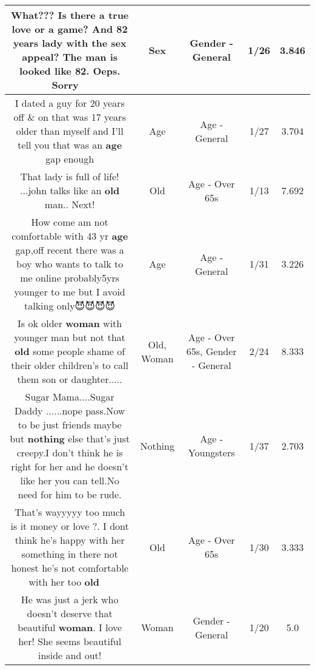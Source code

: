 \documentclass[11pt]{article}
\newlength\mylength
\begin{document}
\begin{center}
\begin{longtable}{|C{.65\mylength}|C{.30\mylength}|C{.12\mylength}|C{.12\mylength}|C{.12\mylength}|}
  \small What??? Is there a true love or a game?  And 82 years lady with the \textbf{sex} appeal? The man is looked like 82. Oeps. Sorry 🙈🙊\normalsize   & Sex & Gender - General & 1/26 & 3.846 \\  \hline
  \small I dated a guy for 20 years off \& on that was 17 years older than myself and I'll tell you that was an \textbf{age} gap enough\normalsize   & Age & Age - General & 1/27 & 3.704 \\  \hline
  \small That lady is full of life! ...john talks like an \textbf{old} man.. Next!\normalsize   & Old & Age - Over 65s & 1/13 & 7.692 \\  \hline
  \small How come am not comfortable with 43 yr \textbf{age} gap,off recent there was a boy who wants to talk to me online probably5yrs younger to me but I avoid talking only😈😈😈😈\normalsize   & Age & Age - General & 1/31 & 3.226 \\  \hline
  \small Is ok older \textbf{woman} with younger man but not that \textbf{old} some people shame of their older  children's  to call them son or daughter.....\normalsize   & Old, Woman & Age - Over 65s, Gender - General & 2/24 & 8.333 \\  \hline
  \small Sugar Mama....Sugar Daddy ......nope pass.Now to be just friends maybe but \textbf{nothing} else that's just creepy.I don't think he is right for her and he doesn't like her you can tell.No need for him to be rude.\normalsize   & Nothing & Age - Youngsters & 1/37 & 2.703 \\  \hline
  \small That's wayyyyy too much is it money or love ?. I dont think he's happy with her something in there not honest he's not comfortable with her too \textbf{old} 😬😬😬\normalsize   & Old & Age - Over 65s & 1/30 & 3.333 \\  \hline
  \small He was just a jerk who doesn't deserve that beautiful \textbf{woman}.  I love her! She seems beautiful  inside and out!\normalsize   & Woman & Gender - General & 1/20 & 5.0 \\  \hline

\end{longtable}
\end{center}
\end{document}
